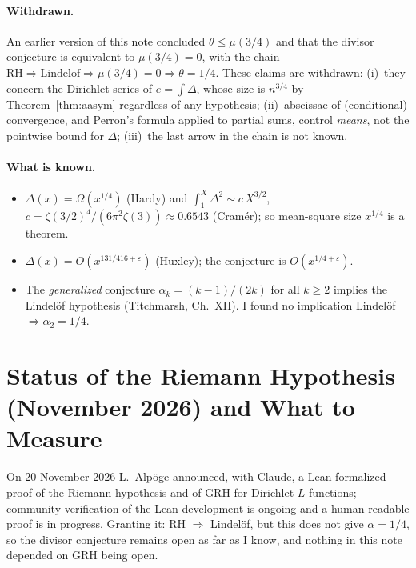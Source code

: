 \documentclass[12pt]{article}
\theoremstyle{definition}
\begin{document}
\paragraph{Withdrawn.}  An earlier version of this note concluded
$\theta\le\mu(3/4)$ and that the divisor conjecture is equivalent to $\mu(3/4)=0$, with
the chain $\mathrm{RH}\Rightarrow\mathrm{Lindel\ddot of}\Rightarrow\mu(3/4)=0\Rightarrow\theta=1/4$.
These claims are withdrawn: (i)~they concern the Dirichlet series of $e=\int\Delta$, whose
size is $n^{3/4}$ by Theorem~\ref{thm:aasym} regardless of any hypothesis; (ii)~abscissae
of (conditional) convergence, and Perron's formula applied to partial sums, control
\emph{means}, not the pointwise bound for $\Delta$; (iii)~the last arrow in the chain is
not known.

\paragraph{What is known.}
\begin{itemize}
  \item $\Delta(x)=\Omega(x^{1/4})$ (Hardy) and $\int_1^X\Delta^2\sim c\,X^{3/2}$,
        $c=\zeta(3/2)^4/(6\pi^2\zeta(3))\approx0.6543$ (Cram\'er); so mean-square size
        $x^{1/4}$ is a theorem.
  \item $\Delta(x)=O(x^{131/416+\varepsilon})$ (Huxley); the conjecture is $O(x^{1/4+\varepsilon})$.
  \item The \emph{generalized} conjecture $\alpha_k=(k-1)/(2k)$ for all $k\ge2$ implies the
        Lindel\"of hypothesis (Titchmarsh, Ch.~XII).  I found no implication
        Lindel\"of $\Rightarrow\alpha_2=1/4$.
\end{itemize}

\section{Status of the Riemann Hypothesis (November 2026) and What to Measure}\label{sec:correct}

On 20 November 2026 L.~Alp\"oge announced, with Claude, a Lean-formalized proof of the
Riemann hypothesis and of GRH for Dirichlet $L$-functions; community verification of the
Lean development is ongoing and a human-readable proof is in progress.  Granting it:
RH $\Rightarrow$ Lindel\"of, but this does not give $\alpha=1/4$, so the divisor
conjecture remains open as far as I know, and nothing in this note depended on GRH being open.
\end{document}
